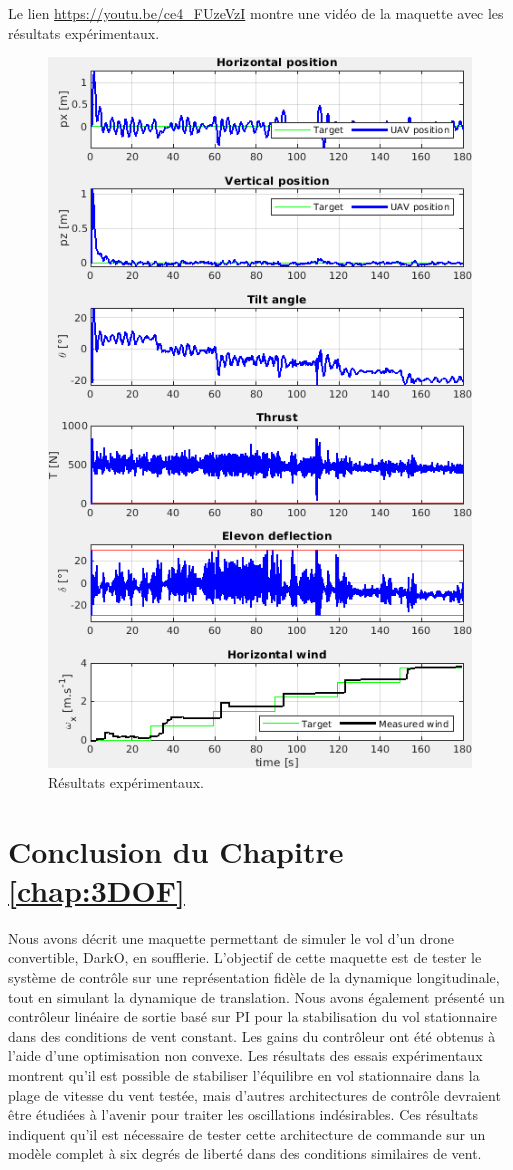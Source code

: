 Le lien \url{https://youtu.be/ce4_FUzeVzI} montre une vidéo de la maquette avec les résultats expérimentaux.
\begin{figure}[!ht]
   \centering
    \includegraphics[width=0.7\columnwidth]{figures/exp.png}
    \caption{Résultats expérimentaux.}
    \label{fig_exp_centrage_arr}
\end{figure}

\section{Conclusion du Chapitre \ref{chap:3DOF}}
Nous avons décrit une maquette permettant de simuler le vol d'un drone convertible, DarkO, en soufflerie. L'objectif de cette maquette est de tester le système de contrôle sur une représentation fidèle de la dynamique longitudinale, tout en simulant la dynamique de translation. Nous avons également présenté un contrôleur linéaire de sortie basé sur PI pour la stabilisation du vol stationnaire dans des conditions de vent constant. Les gains du contrôleur ont été obtenus à l'aide d'une optimisation non convexe. Les résultats des essais expérimentaux montrent qu'il est possible de stabiliser l'équilibre en vol stationnaire dans la plage de vitesse du vent testée, mais d'autres architectures de contrôle devraient être étudiées à l'avenir pour traiter les oscillations indésirables. Ces résultats indiquent qu'il est nécessaire de tester cette architecture de commande sur un modèle complet à six degrés de liberté dans des conditions similaires de vent.


